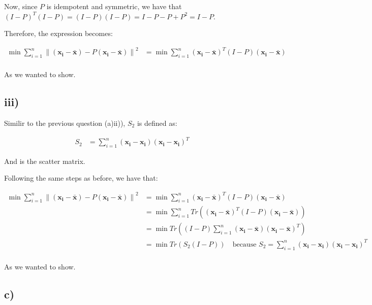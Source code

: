 \documentclass[12pt,a4paper,oneside]{paper}
\begin{document}
Now, since $P$ is idempotent and symmetric, we have that $(I - P)^T (I - P) = (I - P) (I - P) = I - P - P + P^2 = I - P$.

Therefore, the expression becomes:

\begin{align*}
    \min \sum_{i=1}^{n} \left\| \left( \bm{x_i} - \bm{\bar{x}} \right) - P \left( \bm{x_i} - \bm{\bar{x}} \right) \right\|^2 &= \min \sum_{i=1}^{n} \left( \bm{x_i} - \bm{\bar{x}} \right)^T (I - P) \left( \bm{x_i} - \bm{\bar{x}} \right) \\
\end{align*}

As we wanted to show.

\subsection*{iii)}

Similir to the previous question (a)ii)), $S_2$ is defined as:

\begin{align*}
    S_2 &= \sum_{i=1}^{n} \left( \bm{x_i} - \bm{x_i} \right) \left( \bm{x_i} - \bm{x_i} \right)^T
\end{align*}

And is the scatter matrix.

Following the same steps as before, we have that:

\begin{align*}
    \min \sum_{i=1}^{n} \left\| \left( \bm{x_i} - \bm{\bar{x}} \right) - P \left( \bm{x_i} - \bm{\bar{x}} \right) \right\|^2 &= \min \sum_{i=1}^{n} \left( \bm{x_i} - \bm{\bar{x}} \right)^T (I - P) \left( \bm{x_i} - \bm{\bar{x}} \right) \\
    &= \min \sum_{i=1}^{n} Tr \left( \left( \bm{x_i} - \bm{\bar{x}} \right)^T (I - P) \left( \bm{x_i} - \bm{\bar{x}} \right) \right) \\
    &= \min Tr \left( (I - P) \sum_{i=1}^{n} \left( \bm{x_i} - \bm{\bar{x}} \right) \left( \bm{x_i} - \bm{\bar{x}} \right)^T \right) \\
    &= \min Tr \left( S_2 (I - P) \right) \quad {\text{because $S_2 = \sum_{i=1}^{n} \left( \bm{x_i} - \bm{x_i} \right) \left( \bm{x_i} - \bm{x_i} \right)^T$}} \\
\end{align*}

As we wanted to show.

\newpage
\subsection*{c)}
\end{document}
